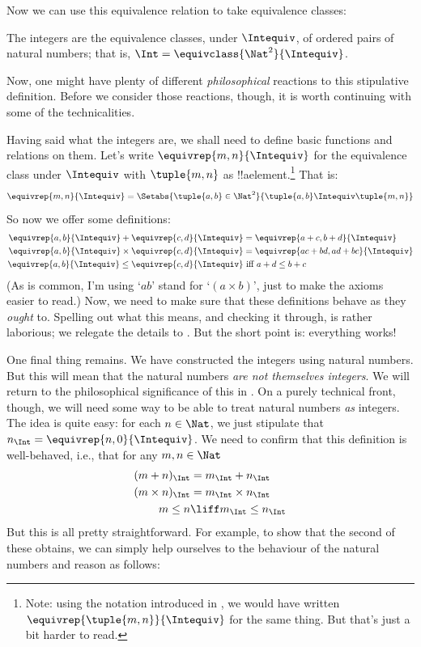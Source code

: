 Now we can use this equivalence relation to take equivalence classes:

\begin{defn}
		The integers are the equivalence classes, under $\Intequiv$, of  ordered pairs of natural numbers; that is, $\Int = \equivclass{\Nat^2}{\Intequiv}$.
\end{defn}

Now, one might have plenty of different \emph{philosophical} reactions to this stipulative definition. Before we consider those reactions, though, it is worth continuing with some of the technicalities. 

Having said what the integers are, we shall need to define basic functions and relations on them. Let's write $\equivrep{m, n}{\Intequiv}$ for the equivalence class under $\Intequiv$ with $\tuple{m, n}$ as !!a{element}.\footnote{Note: using the notation introduced in , we would have written $\equivrep{\tuple{m,n}}{\Intequiv}$ for the same thing. But that's just a bit harder to read.} That is: 
	$$\equivrep{m, n}{\Intequiv} = \Setabs{\tuple{a, b} \in \Nat^2}{\tuple{a, b}\Intequiv \tuple{m, n}}$$
So now we offer some definitions:
	\begin{align*}
		\equivrep{a, b}{\Intequiv} + \equivrep{c, d}{\Intequiv} &= \equivrep{a + c, b + d}{\Intequiv}\\
		\equivrep{a, b}{\Intequiv} \times \equivrep{c, d}{\Intequiv} &= \equivrep{a c + b  d, a  d + b c}{\Intequiv}\\
		\equivrep{a, b}{\Intequiv} \leq \equivrep{c, d}{\Intequiv} &\text{ iff }a + d \leq b + c
	\end{align*}	
(As is common, I'm using `$ab$' stand for `$(a \times b)$', just to make the axioms easier to read.) Now, we need to make sure that these definitions behave as they \emph{ought} to. Spelling out what this means, and checking it through, is rather laborious; we relegate the details to . But the short point is: everything works! 

One final thing remains. We have constructed the integers using
natural numbers. But this will mean that the natural numbers \emph{are
not themselves integers}. We will return to the philosophical
significance of this in . On a purely technical front,
though, we will need some way to be able to treat natural numbers
\emph{as} integers. The idea is quite easy: for each $n \in \Nat$, we
just stipulate that $n_\Int = \equivrep{n, 0}{\Intequiv}$. We need to
confirm that this definition is well-behaved, i.e., that for any $m, n
\in \Nat$
\begin{align*}
	(m + n)_\Int &= m_\Int + n_\Int\\
	(m \times n)_\Int &= m_\Int \times n_\Int\\
	m \leq n &\liff m_\Int \leq n_\Int
\end{align*}
But this is all pretty straightforward. For example, to show that the
second of these obtains, we can simply help ourselves to the behaviour
of the natural numbers and reason as follows:



